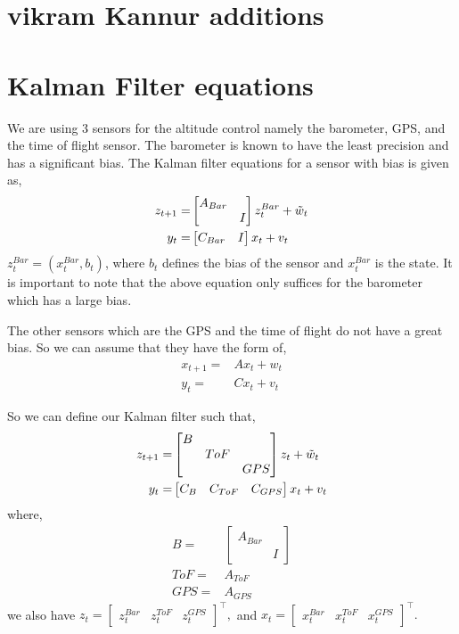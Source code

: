 \documentclass{article}
\begin{document}
\section{vikram Kannur additions}
\section{Kalman Filter equations}
We are using 3 sensors for the altitude control namely the barometer, GPS, and the time of flight sensor. The barometer is known to have the least precision and has a significant bias. The Kalman filter equations for a sensor with bias is given as,
\begin{align}
    z_{t+1}=&\begin{bmatrix}
        A_{Bar}&\\
        &I
    \end{bmatrix}
        z_t^{Bar}
    +
        \Tilde{w}_t \\
    y_t=&\begin{bmatrix}
        C_{Bar}&I
    \end{bmatrix}
        x_t+v_t
\end{align}
$z_t^{Bar}=(x_t^{Bar},b_t)$, where $b_t$ defines the bias of the sensor and $x_t^{Bar}$ is the state. It is important to note that the above equation only suffices for the barometer which has a large bias. 

The other sensors which are the GPS and the time of flight do not have a great bias. So we can assume that they have the form of,
\begin{align}
    x_{t+1}=&Ax_t+w_t\\
    y_t=&Cx_t+v_t
\end{align}

So we can define our Kalman filter such that,
\begin{align}
    z_{t+1}=&\begin{bmatrix}
        B&&\\
        &ToF&\\
        &&GPS
    \end{bmatrix}z_t+\Tilde{w}_t \\
    y_t=&\begin{bmatrix}
        C_B&C_{ToF}&C_{GPS}
    \end{bmatrix}
        x_t+v_t
\end{align}
where,
\begin{align}
    B=&\begin{bmatrix}
        A_{Bar}&\\
        &I
    \end{bmatrix}\\
    ToF=&A_{ToF}\\
    GPS=&A_{GPS}
\end{align}
we also have $z_t=\begin{bmatrix}
   z_t^{Bar}&z_t^{ToF}&z_t^{GPS} 
\end{bmatrix}^\intercal,$  and $x_t=\begin{bmatrix}
    x_t^{Bar}&x_t^{ToF}&x_t^{GPS}
\end{bmatrix}^\intercal.$
\end{document}
